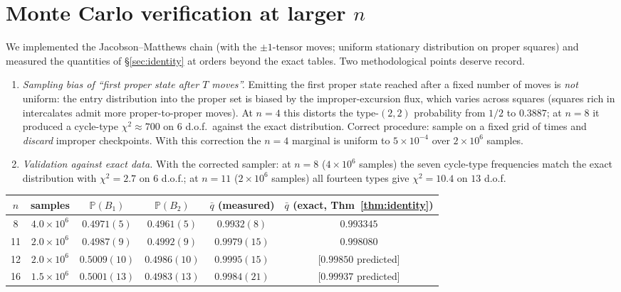 \documentclass[11pt]{article}
\theoremstyle{definition}
\renewcommand{\Pr}{\mathbb{P}}
\begin{document}
\section{Monte Carlo verification at larger \texorpdfstring{$n$}{n}}\label{sec:numerics}

We implemented the Jacobson--Matthews chain \cite{JM96} (with the
$\pm1$-tensor moves; uniform stationary distribution on proper squares) and
measured the quantities of \S\ref{sec:identity} at orders beyond the exact
tables.  Two methodological points deserve record.

\begin{enumerate}[leftmargin=2em]
\item \emph{Sampling bias of ``first proper state after $T$ moves''.}
Emitting the first proper state reached after a fixed number of moves is
\emph{not} uniform: the entry distribution into the proper set is biased by
the improper-excursion flux, which varies across squares (squares rich in
intercalates admit more proper-to-proper moves).  At $n=4$ this distorts the
type-$(2,2)$ probability from $1/2$ to $0.3887$; at $n=8$ it produced a
cycle-type $\chi^2\approx700$ on $6$ d.o.f.\ against the exact distribution.
Correct procedure: sample on a fixed grid of times and \emph{discard}
improper checkpoints.  With this correction the $n=4$ marginal is uniform to
$5\times10^{-4}$ over $2\times10^6$ samples.
\item \emph{Validation against exact data.}  With the corrected sampler:
at $n=8$ ($4\times10^6$ samples) the seven cycle-type frequencies match the
exact distribution with $\chi^2=2.7$ on $6$ d.o.f.; at $n=11$
($2\times10^6$ samples) all fourteen types give $\chi^2=10.4$ on $13$
d.o.f.
\end{enumerate}

\begin{center}
\small
\begin{tabular}{c c c c c c}
\toprule
$n$ & samples & $\Pr(B_1)$ & $\Pr(B_2)$ & $\bar q$ (measured) & $\bar q$ (exact, Thm~\ref{thm:identity})\\
\midrule
8  & $4.0\times10^6$ & $0.4971(5)$ & $0.4961(5)$ & $0.9932(8)$ & $0.993345$\\
11 & $2.0\times10^6$ & $0.4987(9)$ & $0.4992(9)$ & $0.9979(15)$ & $0.998080$\\
12 & $2.0\times10^6$ & $0.5009(10)$ & $0.4986(10)$ & $0.9995(15)$ & [$0.99850$ predicted]\\
16 & $1.5\times10^6$ & $0.5001(13)$ & $0.4983(13)$ & $0.9984(21)$ & [$0.99937$ predicted]\\
\bottomrule
\end{tabular}
\end{center}
\end{document}
